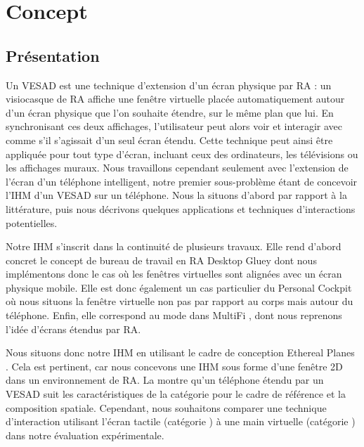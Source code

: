 \chapter{Concept}
\label{ch:concept}

\section{Présentation}
\label{sec:concept_introduction}

Un VESAD est une technique d'extension d'un écran physique par RA : un visiocasque de RA affiche une fenêtre virtuelle placée automatiquement autour d'un écran physique que l'on souhaite étendre, sur le même plan que lui. En synchronisant ces deux affichages, l'utilisateur peut alors voir et interagir avec comme s'il s'agissait d'un seul écran étendu. Cette technique peut ainsi être appliquée pour tout type d'écran, incluant ceux des ordinateurs, les télévisions ou les affichages muraux. Nous travaillons cependant seulement avec l'extension de l'écran d'un téléphone intelligent, notre premier sous-problème étant de concevoir l'IHM d'un VESAD sur un téléphone. Nous la situons d'abord par rapport à la littérature, puis nous décrivons quelques applications et techniques d'interactions potentielles.

Notre IHM s'inscrit dans la continuité de plusieurs travaux. Elle rend d'abord concret le concept de bureau de travail en RA Desktop Gluey \citep{Serrano2015a} dont nous implémentons donc le cas où les fenêtres virtuelles sont alignées avec un écran physique mobile. Elle est donc également un cas particulier du Personal Cockpit \citep{Ens2014} où nous situons la fenêtre virtuelle non pas par rapport au corps mais autour du téléphone. Enfin, elle correspond au mode  dans MultiFi \citep{Grubert2015}, dont nous reprenons l'idée d'écrans étendus par RA.

Nous situons donc notre IHM en utilisant le cadre de conception Ethereal Planes \citep{Ens2014a}. Cela est pertinent, car nous concevons une IHM sous forme d'une fenêtre 2D dans un environnement de RA. La  montre qu'un téléphone étendu par un VESAD suit les caractéristiques de la catégorie  pour le cadre de référence et la composition spatiale. Cependant, nous souhaitons comparer une technique d'interaction utilisant l'écran tactile (catégorie ) à une main virtuelle (catégorie ) dans notre évaluation expérimentale.

